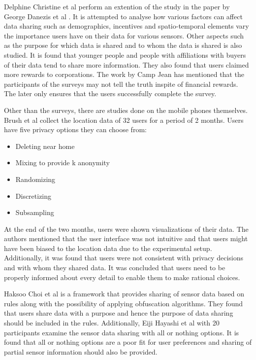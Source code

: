 Delphine Christine et al \cite{christin2013s} perform an extention of the study in the paper by George Danezis et al \cite{danezis2005much}. It is attempted to analyse how various factors can affect data sharing such as demographics, incentives and spatio-temporal elements vary the importance users have on their data for various sensors. Other aspects such as the purpose for which data is shared and to whom the data is shared is also studied. It is found that younger people and people with affiliations with buyers of their data tend to share more information. They also found that users claimed more rewards to corporations. The work by Camp Jean \cite{camp2005state} has mentioned that the participants of the surveys may not tell the truth inspite of financial rewards. The later only ensures that the users successfully complete the survey.

Other than the surveys, there are studies done on the mobile phones themselves. Brush et al \cite{brush2010exploring} collect the location data of 32 users for a period of 2 months. Users have five privacy options they can choose from:

\begin{itemize}
\item Deleting near home
\item Mixing to provide k anonymity
\item Randomizing
\item Discretizing
\item Subsampling
\end{itemize}

At the end of the two months, users were shown visualizations of their data. The authors mentioned that the user interface was not intuitive and that users might have been biased to the location data due to the experimental setup. Additionally, it was found that users were not consistent with privacy decisions and with whom they shared data. It was concluded that users need to be properly informed about every detail to enable them to make rational choices.

Haksoo Choi et al \cite{choi2011sensorsafe} is a framework that provides sharing of sensor data based on rules along with the possibility of applying obfuscation algorithms. They found that users share data with a purpose and hence the purpose of data sharing should be included in the rules. Additionally, Eiji Hayashi et al \cite{hayashi2012goldilocks} with 20 participants examine the sensor data sharing with all or nothing options. It is found that all or nothing options are a poor fit for user preferences and sharing of partial sensor information should also be provided.

